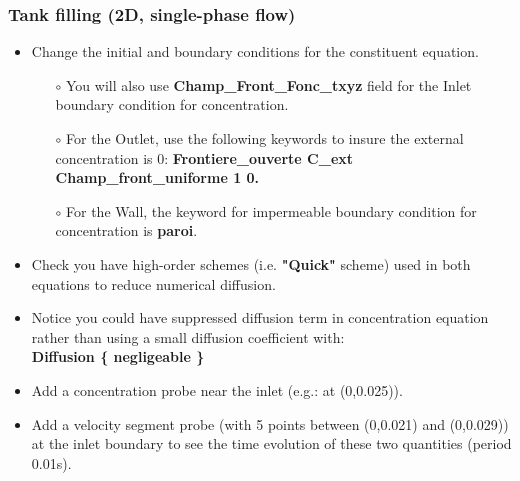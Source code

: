 \documentclass[10pt, hyperref={unicode=true,pdfusetitle, bookmarks=true,bookmarksnumbered=false,bookmarksopen=false, breaklinks=false,pdfborder={0 0 1},backref=true,colorlinks=true,linkcolor=darkblue,pageanchor}]{beamer}
\begin{document}
\begin{frame}
\frametitle{Tank filling (2D, single-phase flow)}
\begin{block}{}

\begin{itemize}
\item Change the initial and boundary conditions for the constituent equation. 
    \begin{itemize}
    \item [$\circ$] You will also use \textbf{Champ\_Front\_Fonc\_txyz} field for the Inlet boundary condition for concentration.
    \item [$\circ$] For the Outlet, use the following keywords to insure the external concentration is 0:
                    \textbf{Frontiere\_ouverte C\_ext Champ\_front\_uniforme 1 0.} \\
    \item [$\circ$] For the Wall, the keyword for impermeable boundary condition for concentration is \textbf{paroi}.
    \end{itemize}
\item Check you have high-order schemes (i.e. \textbf{"Quick"} scheme) used in both equations to reduce numerical diffusion. 
\item Notice you could have suppressed diffusion term in concentration equation rather than using a small diffusion coefficient with:\\
\textbf{Diffusion \{ negligeable \}}
\item Add a concentration probe near the inlet (e.g.: at (0,0.025)).
\item Add a velocity segment probe (with 5 points between (0,0.021) and (0,0.029)) at the inlet boundary to see the time evolution of these two quantities (period 0.01s).
\end{itemize}

\end{block}
\end{frame}
\end{document}
